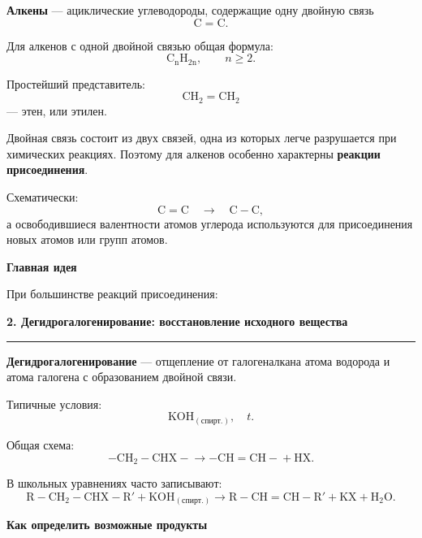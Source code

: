 \documentclass[a4paper,12pt]{article}
\newcommand{\topic}[1]{%
    \vspace{0.5em}
    {\Large\bfseries\textcolor{darkaccent}{#1}}\par
    \vspace{0.25em}
    {\color{accent}\rule{\linewidth}{0.7pt}}
    \vspace{0.4em}
}
\newcommand{\subtopic}[1]{%
    \vspace{0.35em}
    {\large\bfseries\textcolor{accent}{#1}}\par
}
\newcommand{\important}[1]{\textbf{\textcolor{darkaccent}{#1}}}
\begin{document}
\important{Алкены} --- ациклические углеводороды, содержащие одну двойную связь
\[
\mathrm{C=C}.
\]

Для алкенов с одной двойной связью общая формула:
\[
\boxed{\mathrm{C_nH_{2n}}}, \qquad n\ge2.
\]

Простейший представитель:
\[
\mathrm{CH_2=CH_2}
\]
--- этен, или этилен.

Двойная связь состоит из двух связей, одна из которых легче разрушается при химических реакциях. Поэтому для алкенов особенно характерны \important{реакции присоединения}.

Схематически:
\[
\mathrm{C=C}
\quad\longrightarrow\quad
\mathrm{C-C},
\]
а освободившиеся валентности атомов углерода используются для присоединения новых атомов или групп атомов.

\subtopic{Главная идея}

При большинстве реакций присоединения:

\begin{center}
\end{center}


\topic{2. Дегидрогалогенирование: восстановление исходного вещества}

\important{Дегидрогалогенирование} --- отщепление от галогеналкана атома водорода и атома галогена с образованием двойной связи.

Типичные условия:
\[
\mathrm{KOH_{(спирт.)}},\quad t.
\]

Общая схема:
\[
\mathrm{-CH_2-CHX-}
\longrightarrow
\mathrm{-CH=CH-}
+\mathrm{HX}.
\]

В школьных уравнениях часто записывают:
\[
\mathrm{R-CH_2-CHX-R'
+KOH_{(спирт.)}
\longrightarrow
R-CH=CH-R'
+KX+H_2O}.
\]

\subtopic{Как определить возможные продукты}
\end{document}
